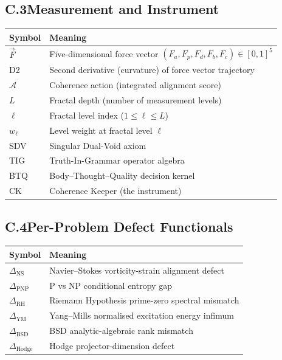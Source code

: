 \documentclass[12pt, openany]{book}
\theoremstyle{remark}
\begin{document}
\subsection*{C.3\quad Measurement and Instrument}

\begin{center}
\begin{tabular}{lp{10cm}}
\toprule
\textbf{Symbol} & \textbf{Meaning} \\
\midrule
$\vec{F}$ & Five-dimensional force vector $(F_a, F_p, F_d, F_b, F_c) \in [0,1]^5$ \\
D2 & Second derivative (curvature) of force vector trajectory \\
$\mathcal{A}$ & Coherence action (integrated alignment score) \\
$L$ & Fractal depth (number of measurement levels) \\
$\ell$ & Fractal level index ($1 \leq \ell \leq L$) \\
$w_\ell$ & Level weight at fractal level $\ell$ \\
SDV & Singular Dual-Void axiom \\
TIG & Truth-In-Grammar operator algebra \\
BTQ & Body--Thought--Quality decision kernel \\
CK & Coherence Keeper (the instrument) \\
\bottomrule
\end{tabular}
\end{center}

\subsection*{C.4\quad Per-Problem Defect Functionals}

\begin{center}
\begin{tabular}{lp{10cm}}
\toprule
\textbf{Symbol} & \textbf{Meaning} \\
\midrule
$\Delta_{\mathrm{NS}}$ & Navier--Stokes vorticity-strain alignment defect \\
$\Delta_{\mathrm{PNP}}$ & P vs NP conditional entropy gap \\
$\Delta_{\mathrm{RH}}$ & Riemann Hypothesis prime-zero spectral mismatch \\
$\Delta_{\mathrm{YM}}$ & Yang--Mills normalised excitation energy infimum \\
$\Delta_{\mathrm{BSD}}$ & BSD analytic-algebraic rank mismatch \\
$\Delta_{\mathrm{Hodge}}$ & Hodge projector-dimension defect \\
\bottomrule
\end{tabular}
\end{center}
\end{document}
